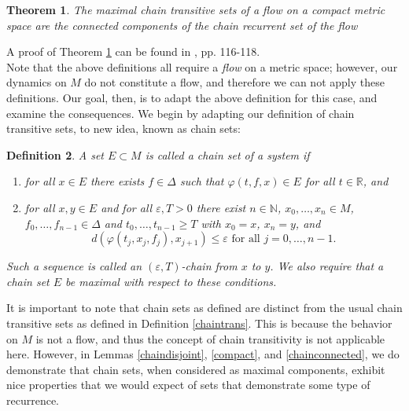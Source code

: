 \documentclass[11pt]{article}
\newtheorem{thm}{Theorem}
\newtheorem{defn}[thm]{Definition}
\begin{document}
\begin{thm}\label{chaincom}
The maximal chain transitive sets of a flow on a compact metric space are the connected components of the chain recurrent set of the flow
\end{thm}
\noindent A proof of Theorem \ref{chaincom} can be found in \cite{Alongi}, pp. 116-118.\\

\indent Note that the above definitions all require a \emph{flow} on a metric space; however, our dynamics on $M$ do not constitute a flow, and therefore we can not apply these definitions.  Our goal, then, is to adapt the above definition for this case, and examine the consequences.  We begin by adapting our definition of chain transitive sets, to new idea, known as chain sets:


\begin{defn} \label{chain set} A set $E\subset M$ is called a chain set of a system if 

\begin{enumerate}
\item for all $x\in E$ there exists $f\in\Delta$ such that $\varphi(t,f,x)\in E$ for all $t\in\mathbb{R}$, and\\
\item for all $x,y\in E$ and for all $\varepsilon,T>0$ there exist $n\in\mathbb{N}$, $x_0,\ldots,x_n\in M$, $f_0,\ldots,f_{n-1}\in\Delta$ and $t_0,\ldots,t_{n-1}\geq T$ with $x_0=x$, $x_n=y$, and 
$$d(\varphi(t_j,x_j,f_j),x_{j+1})\leq\varepsilon\mbox{ for all }j=0,\ldots,n-1.$$
\end{enumerate}
Such a sequence is called an $(\varepsilon,T)$-chain from $x$ to $y$. We also require that a chain set $E$ be maximal with respect to these conditions.
\end{defn}
\indent It is important to note that chain sets as defined are distinct from the usual chain transitive sets as defined in Definition \ref{chaintrans}.  This is because the behavior on $M$ is not a flow, and thus the concept of chain transitivity is not applicable here.  However, in Lemmas \ref{chaindisjoint}, \ref{compact},  and \ref{chainconnected}, we do demonstrate that chain sets, when considered as maximal components, exhibit nice properties that we would expect of sets that demonstrate some type of recurrence. 
\end{document}
